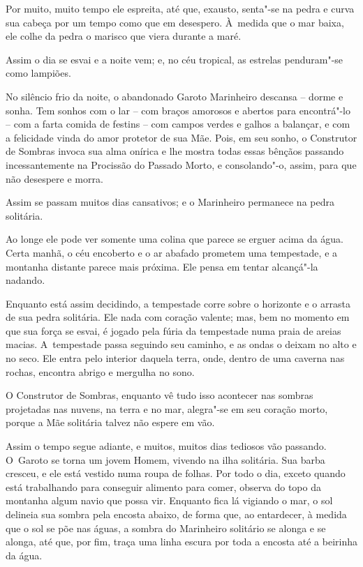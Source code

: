 Por muito, muito tempo ele espreita, até que, exausto, senta"-se na pedra
e curva sua cabeça por um tempo como que em desespero. À~medida que o
mar baixa, ele colhe da pedra o marisco que viera durante a maré.

Assim o dia se esvai e a noite vem; e, no céu tropical, as estrelas
penduram"-se como lampiões.

No silêncio frio da noite, o abandonado Garoto Marinheiro descansa --
dorme e sonha. Tem sonhos com o lar -- com braços amorosos e abertos
para encontrá"-lo -- com a farta comida de festins -- com campos verdes e
galhos a balançar, e com a felicidade vinda do amor protetor de sua Mãe.
Pois, em seu sonho, o Construtor de Sombras invoca sua alma onírica e
lhe mostra todas essas bênçãos passando incessantemente na Procissão do
Passado Morto, e consolando"-o, assim, para que não desespere e morra.


Assim se passam muitos dias cansativos; e o Marinheiro permanece na
pedra solitária.

Ao longe ele pode ver somente uma colina que parece se erguer acima da
água. Certa manhã, o céu encoberto e o ar abafado prometem uma
tempestade, e a montanha distante parece mais próxima. Ele pensa em
tentar alcançá"-la nadando.

Enquanto está assim decidindo, a tempestade corre sobre o horizonte e o
arrasta de sua pedra solitária. Ele nada com coração valente; mas, bem
no momento em que sua força se esvai, é jogado pela fúria da tempestade
numa praia de areias macias. A~tempestade passa seguindo seu caminho, e
as ondas o deixam no alto e no seco. Ele entra pelo interior daquela
terra, onde, dentro de uma caverna nas rochas, encontra abrigo e
mergulha no sono.

O Construtor de Sombras, enquanto vê tudo isso acontecer nas sombras
projetadas nas nuvens, na terra e no mar, alegra"-se em seu coração
morto, porque a Mãe solitária talvez não espere em vão.

\smallskip
Assim o tempo segue adiante, e muitos, muitos dias tediosos vão
passando. O~Garoto se torna um jovem Homem, vivendo na ilha solitária.
Sua barba cresceu, e ele está vestido numa roupa de folhas. Por todo o
dia, exceto quando está trabalhando para conseguir alimento para comer,
observa do topo da montanha algum navio que possa vir. Enquanto fica lá
vigiando o mar, o sol delineia sua sombra pela encosta abaixo, de forma
que, ao entardecer, à medida que o sol se põe nas águas, a sombra do
Marinheiro solitário se alonga e se alonga, até que, por fim, traça uma
linha escura por toda a encosta até a beirinha da água.

